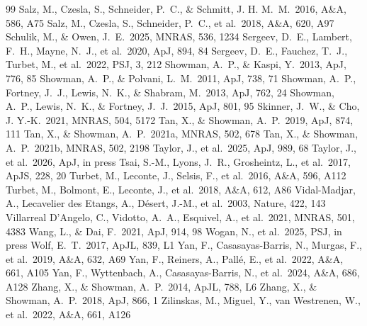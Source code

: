 \documentclass[english,a4paper]{my_memo}
\begin{document}
\begin{thebibliography}{99}
 Salz, M., Czesla, S., Schneider, P.~C., \& Schmitt, J. H. M.~M.\ 2016, A\&A, 586, A75
 Salz, M., Czesla, S., Schneider, P.~C., et al.\ 2018, A\&A, 620, A97
 Schulik, M., \& Owen, J.~E.\ 2025, MNRAS, 536, 1234
 Sergeev, D.~E., Lambert, F.~H., Mayne, N.~J., et al.\ 2020, ApJ, 894, 84
 Sergeev, D.~E., Fauchez, T.~J., Turbet, M., et al.\ 2022, PSJ, 3, 212
 Showman, A.~P., \& Kaspi, Y.\ 2013, ApJ, 776, 85
 Showman, A.~P., \& Polvani, L.~M.\ 2011, ApJ, 738, 71
 Showman, A.~P., Fortney, J.~J., Lewis, N.~K., \& Shabram, M.\ 2013, ApJ, 762, 24
 Showman, A.~P., Lewis, N.~K., \& Fortney, J.~J.\ 2015, ApJ, 801, 95
 Skinner, J.~W., \& Cho, J. Y.-K.\ 2021, MNRAS, 504, 5172
 Tan, X., \& Showman, A.~P.\ 2019, ApJ, 874, 111
 Tan, X., \& Showman, A.~P.\ 2021a, MNRAS, 502, 678
 Tan, X., \& Showman, A.~P.\ 2021b, MNRAS, 502, 2198
 Taylor, J., et al.\ 2025, ApJ, 989, 68
 Taylor, J., et al.\ 2026, ApJ, in press
 Tsai, S.-M., Lyons, J.~R., Grosheintz, L., et al.\ 2017, ApJS, 228, 20
 Turbet, M., Leconte, J., Selsis, F., et al.\ 2016, A\&A, 596, A112
 Turbet, M., Bolmont, E., Leconte, J., et al.\ 2018, A\&A, 612, A86
 Vidal-Madjar, A., Lecavelier des Etangs, A., D\'esert, J.-M., et al.\ 2003, Nature, 422, 143
 Villarreal D'Angelo, C., Vidotto, A.~A., Esquivel, A., et al.\ 2021, MNRAS, 501, 4383
 Wang, L., \& Dai, F.\ 2021, ApJ, 914, 98
 Wogan, N., et al.\ 2025, PSJ, in press
 Wolf, E.~T.\ 2017, ApJL, 839, L1
 Yan, F., Casasayas-Barris, N., Murgas, F., et al.\ 2019, A\&A, 632, A69
 Yan, F., Reiners, A., Pall\'e, E., et al.\ 2022, A\&A, 661, A105
 Yan, F., Wyttenbach, A., Casasayas-Barris, N., et al.\ 2024, A\&A, 686, A128
 Zhang, X., \& Showman, A.~P.\ 2014, ApJL, 788, L6
 Zhang, X., \& Showman, A.~P.\ 2018, ApJ, 866, 1
 Zilinskas, M., Miguel, Y., van Westrenen, W., et al.\ 2022, A\&A, 661, A126
\end{thebibliography}
\end{document}
